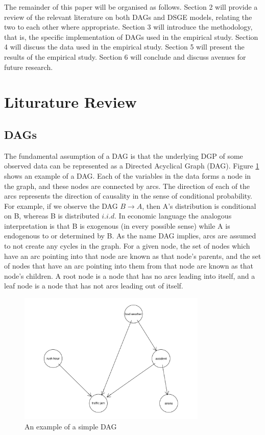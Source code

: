 \documentclass{article}
\begin{document}
The remainder of this paper will be organised as follows. Section 2 will provide a review of the relevant literature on both DAGs and DSGE models, relating the two to each other where appropriate. Section 3 will introduce the methodology, that is, the specific implementation of DAGs used in the empirical study. Section 4 will discuss the data used in the empirical study. Section 5 will present the results of the empirical study. Section 6 will conclude and discuss avenues for future research.

\section{Liturature Review}

\subsection{DAGs}

The fundamental assumption of a DAG is that the underlying DGP of some observed data can be represented as a Directed Acyclical Graph (DAG). Figure \ref{dag1} shows an example of a DAG. Each of the variables in the data forms a node in the graph, and these nodes are connected by arcs. The direction of each of the arcs represents the direction of causality in the sense of conditional probability. For example, if we observe the DAG $B \rightarrow A$, then A's distribution is conditional on B, whereas B is distributed $i.i.d.$ In economic language the analogous interpretation is that B is exogenous (in every possible sense) while A is endogenous to or determined by B. As the name DAG implies, arcs are assumed to not create any cycles in the graph. For a given node, the set of nodes which have an arc pointing into that node are known as that node's parents, and the set of nodes that have an arc pointing into them from that node are known as that node's children. A root node is a node that has no arcs leading into itself, and a leaf node is a node that has not arcs leading out of itself.

\begin{figure}
  \centering
  \includegraphics[width=0.8\textwidth]{images/trafficjam.png}
  \caption{An example of a simple DAG \parencite{traffic_jam}}
  \label{dag1}
\end{figure}
\end{document}
